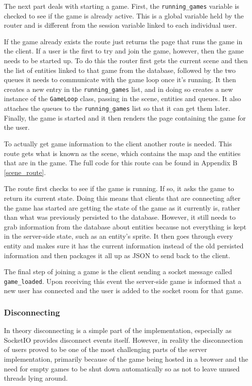 The next part deals with starting a game. First, the \texttt{running\_games} variable is checked to see if the game is already active. This is a global variable held by the router and is different from the session variable linked to each individual user.

If the game already exists the route just returns the page that runs the game in the client. If a user is the first to try and join the game, however, then the game needs to be started up. To do this the router first gets the current scene and then the list of entities linked to that game from the database, followed by the two queues it needs to communicate with the game loop once it's running. It then creates a new entry in the \texttt{running\_games} list, and in doing so creates a new instance of the \texttt{GameLoop} class, passing in the scene, entities and queues. It also attaches the queues to the \texttt{running\_games} list so that it can get them later. Finally, the game is started and it then renders the page containing the game for the user.

To actually get game information to the client another route is needed. This route gets what is known as the scene, which contains the map and the entities that are in the game. The full code for this route can be found in Appendix B \ref{scene_route}.

The route first checks to see if the game is running. If so, it asks the game to return its current state. Doing this means that clients that are connecting after the game has started are getting the state of the game as it currently is, rather than what was previously persisted to the database. However, it still needs to grab information from the database about entities because not everything is kept in the server-side state, such as an entity's sprite. It then goes through every entity and makes sure it has the current information instead of the old persisted information and then packages it all up as JSON to send back to the client.

The final step of joining a game is the client sending a socket message called \texttt{game\_loaded}. Upon receiving this event the server-side game is informed that a new user has connected and the user is added to the socket room for that game.

\subsubsection{Disconnecting}\label{disconnecting}
In theory disconnecting is a simple part of the implementation, especially as SocketIO provides disconnect events itself. However, in reality the disconnection of users proved to be one of the most challenging parts of the server implementation, primarily because of the game being hosted in a browser and the need for empty games to be shut down automatically so as not to leave unused threads lying around.

